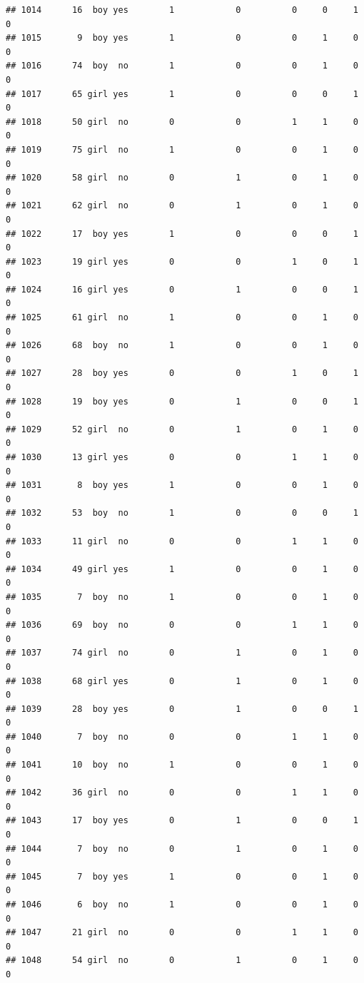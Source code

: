 \documentclass[man]{apa6}
\begin{document}
\begin{verbatim}
## 1014      16  boy yes        1            0          0     0     1     0
## 1015       9  boy yes        1            0          0     1     0     0
## 1016      74  boy  no        1            0          0     1     0     0
## 1017      65 girl yes        1            0          0     0     1     0
## 1018      50 girl  no        0            0          1     1     0     0
## 1019      75 girl  no        1            0          0     1     0     0
## 1020      58 girl  no        0            1          0     1     0     0
## 1021      62 girl  no        0            1          0     1     0     0
## 1022      17  boy yes        1            0          0     0     1     0
## 1023      19 girl yes        0            0          1     0     1     0
## 1024      16 girl yes        0            1          0     0     1     0
## 1025      61 girl  no        1            0          0     1     0     0
## 1026      68  boy  no        1            0          0     1     0     0
## 1027      28  boy yes        0            0          1     0     1     0
## 1028      19  boy yes        0            1          0     0     1     0
## 1029      52 girl  no        0            1          0     1     0     0
## 1030      13 girl yes        0            0          1     1     0     0
## 1031       8  boy yes        1            0          0     1     0     0
## 1032      53  boy  no        1            0          0     0     1     0
## 1033      11 girl  no        0            0          1     1     0     0
## 1034      49 girl yes        1            0          0     1     0     0
## 1035       7  boy  no        1            0          0     1     0     0
## 1036      69  boy  no        0            0          1     1     0     0
## 1037      74 girl  no        0            1          0     1     0     0
## 1038      68 girl yes        0            1          0     1     0     0
## 1039      28  boy yes        0            1          0     0     1     0
## 1040       7  boy  no        0            0          1     1     0     0
## 1041      10  boy  no        1            0          0     1     0     0
## 1042      36 girl  no        0            0          1     1     0     0
## 1043      17  boy yes        0            1          0     0     1     0
## 1044       7  boy  no        0            1          0     1     0     0
## 1045       7  boy yes        1            0          0     1     0     0
## 1046       6  boy  no        1            0          0     1     0     0
## 1047      21 girl  no        0            0          1     1     0     0
## 1048      54 girl  no        0            1          0     1     0     0

\end{verbatim}
\end{document}
